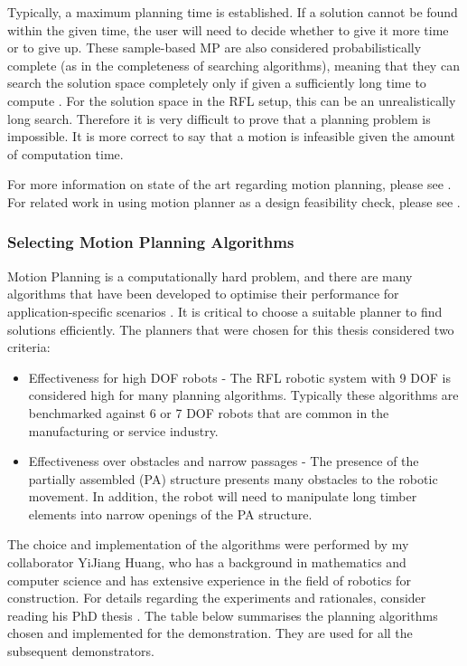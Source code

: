 Typically, a maximum planning time is established. If a solution cannot be found within the given time, the user will need to decide whether to give it more time or to give up. These sample-based MP are also considered probabilistically complete (as in the completeness of searching algorithms), meaning that they can search the solution space completely only if given a sufficiently long time to compute \parencite{lavallePlanningAlgorithms2006}. For the solution space in the RFL setup, this can be an unrealistically long search. Therefore it is very difficult to prove that a planning problem is impossible. It is more correct to say that a motion is infeasible given the amount of computation time.

For more information on state of the art regarding motion planning, please see \parencite{garrettIntegratedTaskMotion2021a}. For related work in using motion planner as a design feasibility check, please see \parencite{gandiaAutomaticPathPlanning2018}. 

\subsubsection{Selecting Motion Planning Algorithms}

Motion Planning is a computationally hard problem, and there are many algorithms that have been developed to optimise their performance for application-specific scenarios \parencite{lavallePlanningAlgorithms2006}. It is critical to choose a suitable planner to find solutions efficiently. The planners that were chosen for this thesis considered two criteria:
\begin{itemize}
    \item Effectiveness for high DOF robots - The RFL robotic system with 9 DOF is considered high for many planning algorithms. Typically these algorithms are benchmarked against 6 or 7 DOF robots that are common in the manufacturing or service industry.
    \item Effectiveness over obstacles and narrow passages - The presence of the partially assembled (PA) structure presents many obstacles to the robotic movement. In addition, the robot will need to manipulate long timber elements into narrow openings of the PA structure.
\end{itemize}

The choice and implementation of the algorithms were performed by my collaborator YiJiang Huang, who has a background in mathematics and computer science and has extensive experience in the field of robotics for construction. For details regarding the experiments and rationales, consider reading his PhD thesis \parencite{huangAlgorithmicPlanningRobotic2022}. The table below summarises the planning algorithms chosen and implemented for the demonstration. They are used for all the subsequent demonstrators.

